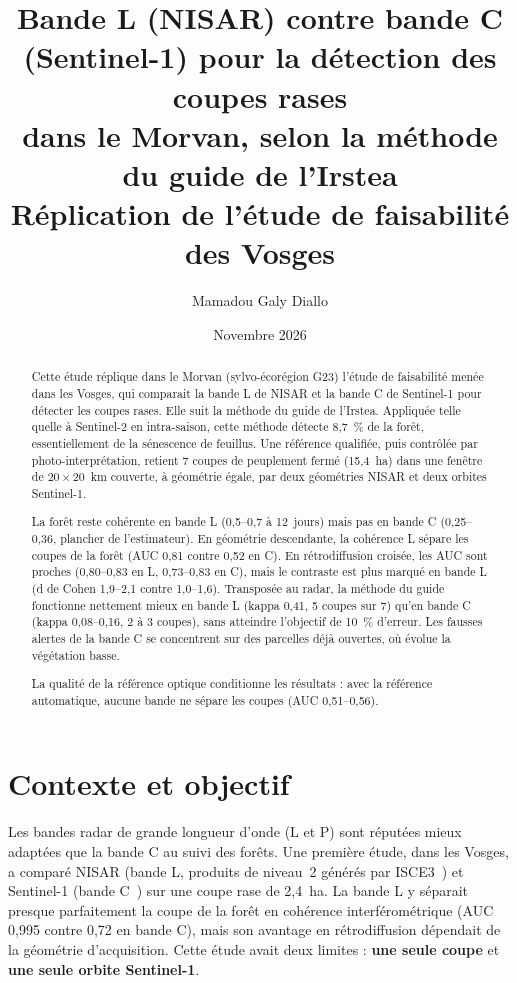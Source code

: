 \documentclass[11pt,a4paper]{article}
\title{Bande L (NISAR) contre bande C (Sentinel-1) pour la détection des coupes rases\\
dans le Morvan, selon la méthode du guide de l'Irstea\\[0.4em]
\large Réplication de l'étude de faisabilité des Vosges}
\author{Mamadou Galy Diallo}
\date{Novembre 2026}
\begin{document}
\maketitle

\begin{abstract}
\noindent
Cette étude réplique dans le Morvan (sylvo-écorégion G23) l'étude de faisabilité menée dans les Vosges, qui
comparait la bande L de NISAR et la bande C de Sentinel-1 pour détecter les coupes rases. Elle suit la méthode du
guide de l'Irstea. Appliquée telle quelle à Sentinel-2 en intra-saison, cette méthode détecte 8,7~\% de la forêt,
essentiellement de la sénescence de feuillus. Une référence qualifiée, puis contrôlée par photo-interprétation,
retient 7 coupes de peuplement fermé (15,4~ha) dans une fenêtre de $20\times20$~km couverte, à géométrie égale,
par deux géométries NISAR et deux orbites Sentinel-1.

La forêt reste cohérente en bande L (0,5--0,7 à 12~jours) mais pas en bande C (0,25--0,36, plancher de
l'estimateur). En géométrie descendante, la cohérence L sépare les coupes de la forêt (AUC 0,81 contre 0,52 en C).
En rétrodiffusion croisée, les AUC sont proches (0,80--0,83 en L, 0,73--0,83 en C), mais le contraste est plus
marqué en bande L (d de Cohen 1,9--2,1 contre 1,0--1,6). Transposée au radar, la méthode du guide fonctionne
nettement mieux en bande L (kappa 0,41, 5 coupes sur 7) qu'en bande C (kappa 0,08--0,16, 2 à 3 coupes), sans
atteindre l'objectif de 10~\% d'erreur. Les fausses alertes de la bande C se concentrent sur des parcelles déjà
ouvertes, où évolue la végétation basse.

La qualité de la référence optique conditionne les résultats : avec la référence automatique, aucune bande ne
sépare les coupes (AUC 0,51--0,56).
\end{abstract}

\tableofcontents
\newpage

\section{Contexte et objectif}

Les bandes radar de grande longueur d'onde (L et P) sont réputées mieux adaptées que la bande C au suivi des
forêts. Une première étude, dans les Vosges, a comparé NISAR (bande L, produits
de niveau~2 générés par ISCE3~\cite{isce3}) et Sentinel-1 (bande C~\cite{torres2012sentinel1}) sur une coupe rase
de 2,4~ha. La bande L y séparait presque parfaitement la coupe de la forêt en cohérence interférométrique
(AUC 0,995 contre 0,72 en bande C), mais son avantage en rétrodiffusion dépendait de la géométrie d'acquisition.
Cette étude avait deux limites : \textbf{une seule coupe} et \textbf{une seule orbite Sentinel-1}.
\end{document}
